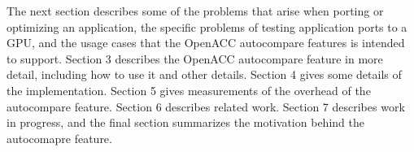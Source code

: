 The next section describes some of the problems that arise when porting or optimizing an application, the specific problems of testing application ports to a GPU, and the usage cases that the OpenACC autocompare features is intended to support.
Section 3 describes the OpenACC autocompare feature in more detail, including how to use it and other details.
Section 4 gives some details of the implementation.
Section 5 gives measurements of the overhead of the autocompare feature.
Section 6 describes related work. 
Section 7 describes work in progress, and 
the final section summarizes the motivation behind the autocomapre feature.



